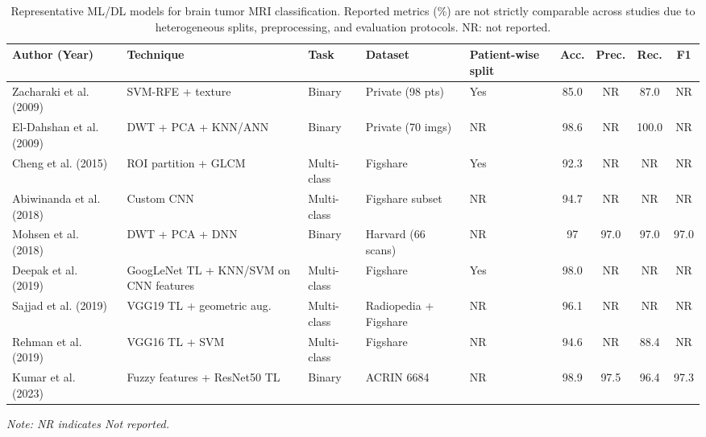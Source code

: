 \begin{table}[H]
\centering
\scriptsize
\setlength{\tabcolsep}{4pt}
\renewcommand{\arraystretch}{1.8}
\caption{Representative ML/DL models for brain tumor MRI classification. Reported metrics (\%) are not strictly comparable across studies due to heterogeneous splits, preprocessing, and evaluation protocols. NR: not reported.}


\begin{tabular}{|p{2.2cm}|p{2.4cm}|p{1.6cm}|p{2.5cm}|p{1.7cm}|c|c|c|c|}
\hline
\textbf{Author (Year)} & \textbf{Technique} & \textbf{Task} & \textbf{Dataset} & \textbf{Patient-wise split} & \textbf{Acc.} & \textbf{Prec.} & \textbf{Rec.} & \textbf{F1} \\
\hline
Zacharaki et al. (2009)~\cite{5193232} 
& SVM-RFE + texture 
& Binary 
& Private (98 pts) 
& Yes 
& 85.0 & NR & 87.0 & NR \\
\hline
El-Dahshan et al. (2009)~\cite{ELDAHSHAN2010433} 
& DWT + PCA + KNN/ANN 
& Binary 
& Private (70 imgs) 
& NR 
& 98.6 & NR & 100.0 & NR \\
\hline
Cheng et al. (2015)~\cite{Cheng2015} 
& ROI partition + GLCM 
& Multi-class 
& Figshare
& Yes 
& 92.3 & NR & NR & NR \\
\hline
Abiwinanda et al. (2018)~\cite{abiwinanda} 
& Custom CNN 
& Multi-class 
& Figshare subset
& NR 
& 94.7 & NR & NR & NR \\
\hline
Mohsen et al. (2018)~\cite{mohsen2018classification} 
& DWT + PCA + DNN 
& Binary 
& Harvard (66 scans) 
& NR 
& 97 & 97.0 & 97.0 & 97.0 \\
\hline
Deepak et al. (2019)~\cite{deepak2019brain} 
& GoogLeNet TL + KNN/SVM on CNN features 
& Multi-class 
& Figshare
& Yes 
& 98.0 & NR & NR & NR \\
\hline
Sajjad et al. (2019)~\cite{sajjad2019multigrade} 
& VGG19 TL + geometric aug. 
& Multi-class 
& Radiopedia + Figshare
& NR 
& 96.1 & NR & NR & NR \\
\hline
Rehman et al. (2019)~\cite{Rehman2020} 
& VGG16 TL + SVM 
& Multi-class 
& Figshare
& NR 
& 94.6 & NR & 88.4 & NR \\
\hline
Kumar et al. (2023)~\cite{kumar2023braintumor} 
& Fuzzy features + ResNet50 TL 
& Binary 
& ACRIN 6684 
& NR 
& 98.9 & 97.5 & 96.4 & 97.3 \\
\hline
\end{tabular}
\vspace{0.5em}
\footnotesize\textit{Note: NR indicates Not reported.}

\label{tab:classification_models}
\end{table}


